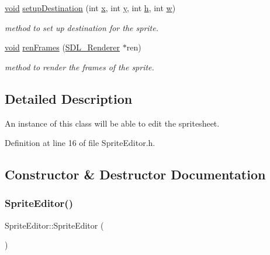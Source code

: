 \begin{DoxyCompactItemize}
\mbox{\hyperlink{_s_d_l__opengles2__gl2ext_8h_ae5d8fa23ad07c48bb609509eae494c95}{void}} \mbox{\hyperlink{class_sprite_editor_a3a52a8f8d53121a14b0a31043a977d87}{setup\+Destination}} (int \mbox{\hyperlink{_s_d_l__opengl_8h_ad0e63d0edcdbd3d79554076bf309fd47}{x}}, int \mbox{\hyperlink{_s_d_l__opengl_8h_a1675d9d7bb68e1657ff028643b4037e3}{y}}, int \mbox{\hyperlink{_s_d_l__opengl__glext_8h_afa0fb1b5e976920c0abeff2dca3ed774}{h}}, int \mbox{\hyperlink{_s_d_l__opengl__glext_8h_a6ee8f168a7ab6785a9bb57c6715dad99}{w}})
\begin{DoxyCompactList}\small\item\em method to set up destination for the sprite. \end{DoxyCompactList}\item 
\mbox{\hyperlink{_s_d_l__opengles2__gl2ext_8h_ae5d8fa23ad07c48bb609509eae494c95}{void}} \mbox{\hyperlink{class_sprite_editor_a786801f365bc4a70a11443948c27dd43}{ren\+Frames}} (\mbox{\hyperlink{_s_d_l__render_8h_aaf0bf7d020754fc614fe06552ea4d5d4}{S\+D\+L\+\_\+\+Renderer}} $\ast$ren)
\begin{DoxyCompactList}\small\item\em method to render the frames of the sprite. \end{DoxyCompactList}\end{DoxyCompactItemize}


\subsection{Detailed Description}
An instance of this class will be able to edit the spritesheet. 

Definition at line 16 of file Sprite\+Editor.\+h.



\subsection{Constructor \& Destructor Documentation}
\mbox{\label{class_sprite_editor_ae4731260f822071b9306f154048076be}} 
\subsubsection{\texorpdfstring{SpriteEditor()}{SpriteEditor()}}
{\footnotesize\ttfamily Sprite\+Editor\+::\+Sprite\+Editor (\begin{DoxyParamCaption}{ }\end{DoxyParamCaption})\hspace{0.3cm}{\ttfamily [inline]}}



